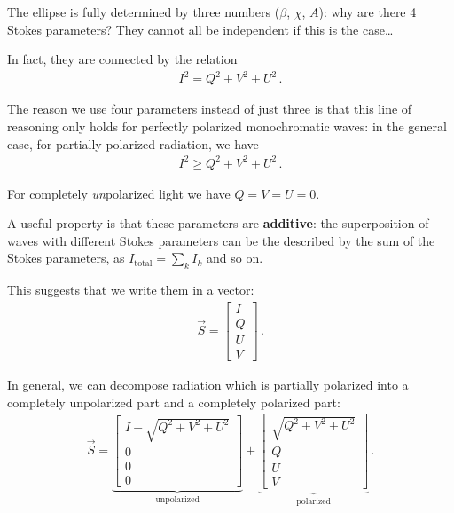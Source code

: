 \documentclass[main.tex]{subfiles}
\begin{document}
The ellipse is fully determined by three numbers (\(\beta \), \(\chi \), \(A\)): why are there 4 Stokes parameters? They cannot all be independent if this is the case\dots  

In fact, they are connected by the relation 
%
\begin{align}
I^2= Q^2 + V^2+ U^2
\,.
\end{align}

The reason we use four parameters instead of just three is that this line of reasoning only holds for perfectly polarized monochromatic waves: in the general case, for partially polarized radiation, we have 
%
\begin{align}
I^2 \geq Q^2 + V^2 + U^2
\,.
\end{align}

For completely \emph{un}polarized light we have \(Q = V = U = 0\). 

A useful property is that these parameters are \textbf{additive}: the superposition of waves with different Stokes parameters can be the described by the sum of the Stokes parameters, as \(I _{\text{total}} = \sum _{k} I_k\) and so on. 

This suggests that we write them in a vector: 
%
\begin{align}
\vec{S} = \left[\begin{array}{c}
I \\ 
Q \\ 
U \\ 
V
\end{array}\right]
\,.
\end{align}

In general, we can decompose radiation which is partially polarized into a completely unpolarized part and a completely polarized part: 
%
\begin{align}
\vec{S} = \underbrace{\left[\begin{array}{c}
I - \sqrt{Q^2+V^2+U^2} \\ 
0 \\ 
0 \\ 
0
\end{array}\right]}_{\text{unpolarized}}
+ 
\underbrace{\left[\begin{array}{c}
\sqrt{Q^2+V^2+U^2} \\ 
Q \\ 
U \\ 
V
\end{array}\right]}_{\text{polarized}}
\,.
\end{align}
\end{document}
